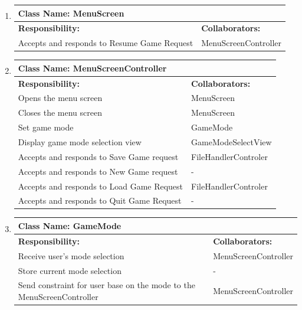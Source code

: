 \documentclass[]{article}
\begin{document}
\begin{enumerate}[1.]
\begin{tabular}{|p{10cm}|p{4cm}|}
	    \hline
	  \end{tabular}

	\item
	\begin{tabular}{|p{10cm}|p{4cm}|}
	    \hline
	     \multicolumn{2}{|l|}{\textbf{Class Name:  MenuScreen}} \\
	    \hline
	    \textbf{Responsibility:} & \textbf{Collaborators:} \\
	    \hline
	    Accepts and responds to Resume Game Request & MenuScreenController \\

	    \hline
	  \end{tabular}

	\item
	\begin{tabular}{|p{10cm}|p{4cm}|}
	    \hline
	     \multicolumn{2}{|l|}{\textbf{Class Name:  MenuScreenController}} \\
	    \hline
	    \textbf{Responsibility:} & \textbf{Collaborators:} \\
	    \hline
	    Opens the menu screen & MenuScreen \\
	Closes the menu screen & MenuScreen \\
	Set game mode & GameMode \\
	Display game mode selection view & GameModeSelectView \\
	Accepts and responds to Save Game request & FileHandlerControler \\
	Accepts and responds to New Game request & - \\
	Accepts and responds to Load Game Request & FileHandlerControler \\
	Accepts and responds to Quit Game Request & - \\

	    \hline
	  \end{tabular}

	\item
	\begin{tabular}{|p{10cm}|p{4cm}|}
	    \hline
	     \multicolumn{2}{|l|}{\textbf{Class Name:  GameMode}} \\
	    \hline
	    \textbf{Responsibility:} & \textbf{Collaborators:} \\
	    \hline
	    Receive user’s mode selection & MenuScreenController \\
	Store current mode selection & - \\
	Send constraint for user base on the mode to the MenuScreenController & MenuScreenController \\


\end{tabular}
\end{enumerate}
\end{document}

